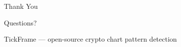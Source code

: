 \documentclass[11pt]{beamer}
\begin{document}
\begin{frame}
    \centering
    \vfill
    {\Huge Thank You}
    \vspace{0.5cm}

    {\large Questions?}

    \vfill
    \small TickFrame --- open-source crypto chart pattern detection
\end{frame}
\end{document}
